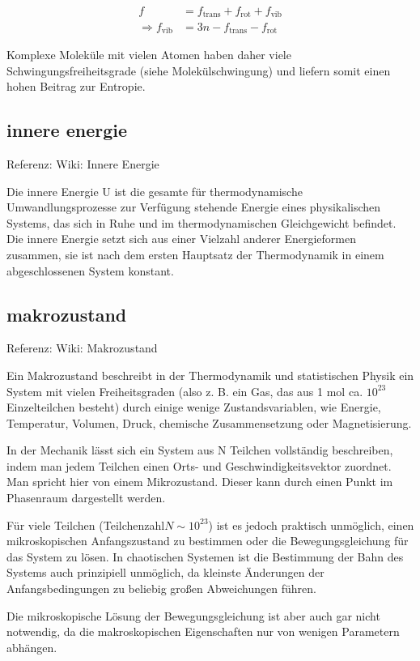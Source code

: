 \documentclass[]{article}
\begin{document}
\begin{align} f & = f_\mathrm{trans} + f_\mathrm{rot} + f_\mathrm{vib}\\ 
\Rightarrow f_\mathrm{vib} & = 3n - f_\mathrm{trans} - f_\mathrm{rot} 
\end{align}

Komplexe Moleküle mit vielen Atomen haben daher viele Schwingungsfreiheitsgrade (siehe Molekülschwingung) und liefern somit einen hohen Beitrag zur Entropie.

\subsection{innere energie}
Referenz: Wiki: Innere Energie

Die innere Energie U ist die gesamte für thermodynamische Umwandlungsprozesse zur Verfügung stehende Energie eines physikalischen Systems, das sich in Ruhe und im thermodynamischen Gleichgewicht befindet. Die innere Energie setzt sich aus einer Vielzahl anderer Energieformen zusammen, sie ist nach dem ersten Hauptsatz der Thermodynamik in einem abgeschlossenen System konstant.

\subsection{makrozustand}
Referenz: Wiki: Makrozustand

Ein Makrozustand beschreibt in der Thermodynamik und statistischen Physik ein System mit vielen Freiheitsgraden (also z. B. ein Gas, das aus 1 mol ca. $10^{23}$ Einzelteilchen besteht) durch einige wenige Zustandsvariablen, wie Energie, Temperatur, Volumen, Druck, chemische Zusammensetzung oder Magnetisierung.

In der Mechanik lässt sich ein System aus N Teilchen vollständig beschreiben, indem man jedem Teilchen einen Orts- und Geschwindigkeitsvektor zuordnet. Man spricht hier von einem Mikrozustand. Dieser kann durch einen Punkt im Phasenraum dargestellt werden.

Für viele Teilchen (Teilchenzahl$ N \sim 10^{23}$) ist es jedoch praktisch unmöglich, einen mikroskopischen Anfangszustand zu bestimmen oder die Bewegungsgleichung für das System zu lösen. In chaotischen Systemen ist die Bestimmung der Bahn des Systems auch prinzipiell unmöglich, da kleinste Änderungen der Anfangsbedingungen zu beliebig großen Abweichungen führen.

Die mikroskopische Lösung der Bewegungsgleichung ist aber auch gar nicht notwendig, da die makroskopischen Eigenschaften nur von wenigen Parametern abhängen.
\end{document}
